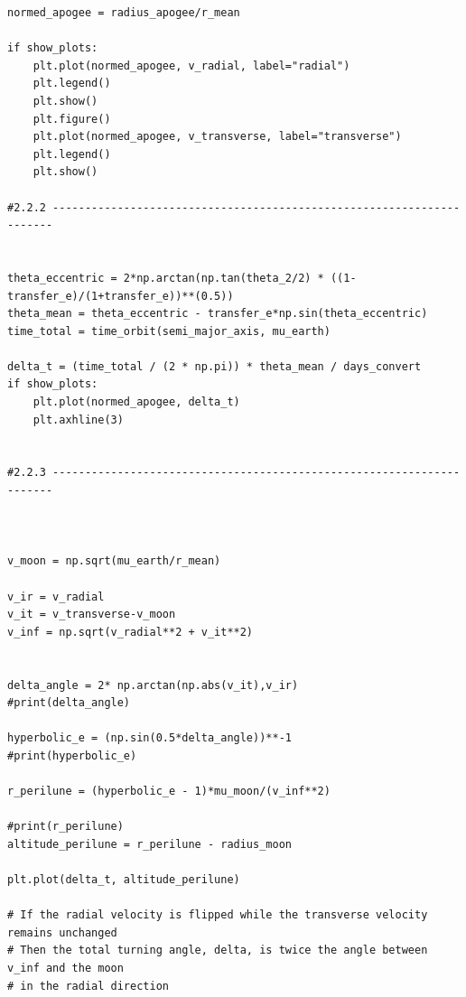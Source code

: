 \documentclass[a4paper, 12pt]{article}  %
\begin{document}
\begin{lstlisting}
normed_apogee = radius_apogee/r_mean

if show_plots:
    plt.plot(normed_apogee, v_radial, label="radial")
    plt.legend()
    plt.show()
    plt.figure()
    plt.plot(normed_apogee, v_transverse, label="transverse")
    plt.legend()
    plt.show()

#2.2.2 ----------------------------------------------------------------------
 

theta_eccentric = 2*np.arctan(np.tan(theta_2/2) * ((1-transfer_e)/(1+transfer_e))**(0.5))
theta_mean = theta_eccentric - transfer_e*np.sin(theta_eccentric)
time_total = time_orbit(semi_major_axis, mu_earth)

delta_t = (time_total / (2 * np.pi)) * theta_mean / days_convert
if show_plots:
    plt.plot(normed_apogee, delta_t)
    plt.axhline(3)
    
    
#2.2.3 ----------------------------------------------------------------------
 


v_moon = np.sqrt(mu_earth/r_mean)

v_ir = v_radial
v_it = v_transverse-v_moon
v_inf = np.sqrt(v_radial**2 + v_it**2)


delta_angle = 2* np.arctan(np.abs(v_it),v_ir)
#print(delta_angle)

hyperbolic_e = (np.sin(0.5*delta_angle))**-1
#print(hyperbolic_e)

r_perilune = (hyperbolic_e - 1)*mu_moon/(v_inf**2)

#print(r_perilune)
altitude_perilune = r_perilune - radius_moon

plt.plot(delta_t, altitude_perilune)

# If the radial velocity is flipped while the transverse velocity remains unchanged
# Then the total turning angle, delta, is twice the angle between v_inf and the moon
# in the radial direction




    
    
    
    
    
    
    
    


\end{lstlisting}
\end{document}
